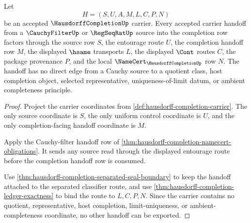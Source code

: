 \begin{theorem}
\label{thm:hausdorffcompletion-cauchy-entourage-handoff-exactness}
Let
$$
H=(S,U,A,M,L,C,P,N)
$$
be an accepted $\HausdorffCompletionUp$ carrier. Every accepted carrier handoff from a $\CauchyFilterUp$ or $\RegSeqRatUp$ source into the completion row factors through the source row $S$, the entourage route $U$, the completion handoff row $M$, the displayed $\hsame$ transports $L$, the displayed $\Cont$ routes $C$, the package provenance $P$, and the local $\NameCert_{\HausdorffCompletionUp}$ row $N$. The handoff has no direct edge from a Cauchy source to a quotient class, host completion object, selected representative, uniqueness-of-limit datum, or ambient completeness principle.
\end{theorem}
\begin{proof}
Project the carrier coordinates from \autoref{def:hausdorff-completion-carrier}. The only source coordinate is $S$, the only uniform control coordinate is $U$, and the only completion-facing handoff coordinate is $M$.

Apply the Cauchy-filter handoff row of \autoref{thm:hausdorff-completion-namecert-obligations}. It sends any source read through the displayed entourage route before the completion handoff row is consumed.

Use \autoref{thm:hausdorff-completion-separated-seal-boundary} to keep the handoff attached to the separated classifier route, and use \autoref{thm:hausdorff-completion-ledger-exactness} to bind the route to $L,C,P,N$. Since the carrier contains no quotient, representative, host completion, limit-uniqueness, or ambient-completeness coordinate, no other handoff can be exported.
\end{proof}

